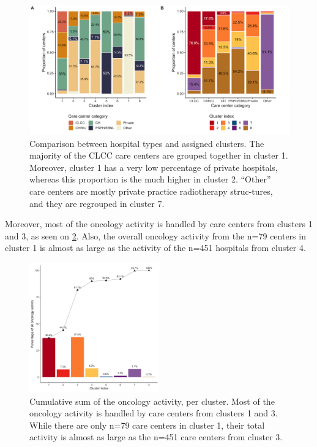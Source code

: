 \begin{figure}[h]
    \includegraphics[width=\textwidth]{images/camion/supplemental/sup_fig2_categories_per_cluster.png}
    \centering
    \caption{
        Comparison between hospital types and assigned clusters. The majority of the CLCC care centers are grouped together in cluster 1. Moreover, cluster 1 has a very low percentage of private hospitals, whereas this proportion is the much higher in cluster 2. “Other” care centers are mostly private practice radiotherapy struc-tures, and they are regrouped in cluster 7.
    }
    \label{fig:clustering-categories}
\end{figure}

Moreover, most of the oncology activity is handled by care centers from clusters 1 and 3, as seen on \cref{fig:clustering-cumulative}. Also, the overall oncology activity from the n=79 centers in cluster 1 is almost as large as the activity of the n=451 hospitals from cluster 4.

\begin{figure}[h]
    \includegraphics[width=0.5\textwidth]{images/camion/supplemental/sup_fig3_nb_stays_per_cluster.png}
    \centering
    \caption{
        Cumulative sum of the oncology activity, per cluster. Most of the oncology activity is handled by care centers from clusters 1 and 3. While there are only n=79 care centers in cluster 1, their total activity is almost as large as the n=451 care centers from cluster 3.
    }
    \label{fig:clustering-cumulative}
\end{figure}

